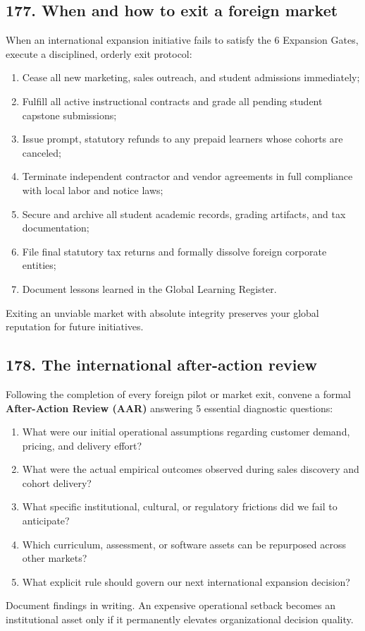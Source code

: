 \subsection{177. When and how to exit a foreign market}

When an international expansion initiative fails to satisfy the 6 Expansion Gates, execute a disciplined, orderly exit protocol:
\begin{enumerate}
    \item Cease all new marketing, sales outreach, and student admissions immediately;
    \item Fulfill all active instructional contracts and grade all pending student capstone submissions;
    \item Issue prompt, statutory refunds to any prepaid learners whose cohorts are canceled;
    \item Terminate independent contractor and vendor agreements in full compliance with local labor and notice laws;
    \item Secure and archive all student academic records, grading artifacts, and tax documentation;
    \item File final statutory tax returns and formally dissolve foreign corporate entities;
    \item Document lessons learned in the Global Learning Register.
\end{enumerate}
Exiting an unviable market with absolute integrity preserves your global reputation for future initiatives.

\subsection{178. The international after-action review}

Following the completion of every foreign pilot or market exit, convene a formal \textbf{After-Action Review (AAR)} answering 5 essential diagnostic questions:
\begin{enumerate}
    \item What were our initial operational assumptions regarding customer demand, pricing, and delivery effort?
    \item What were the actual empirical outcomes observed during sales discovery and cohort delivery?
    \item What specific institutional, cultural, or regulatory frictions did we fail to anticipate?
    \item Which curriculum, assessment, or software assets can be repurposed across other markets?
    \item What explicit rule should govern our next international expansion decision?
\end{enumerate}
Document findings in writing. An expensive operational setback becomes an institutional asset only if it permanently elevates organizational decision quality.


